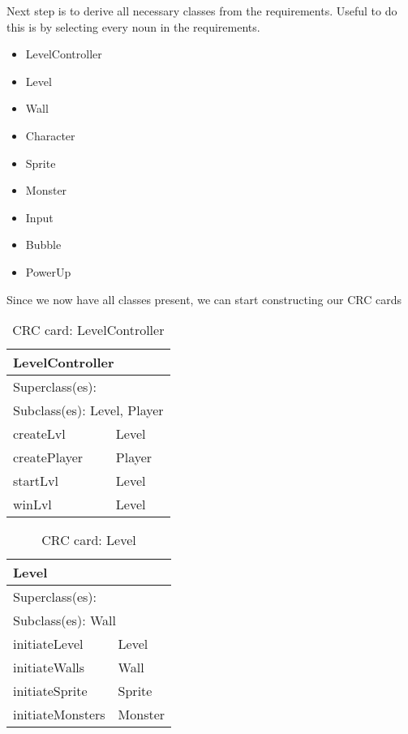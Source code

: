 \noindent Next step is to derive all necessary classes from the requirements. Useful to do this is by selecting every noun in the requirements. 
\begin{itemize}
    \item LevelController
    \item Level
    \item Wall
    \item Character
    \item Sprite
    \item Monster
    \item Input
    \item Bubble
    \item PowerUp
\end{itemize}

\noindent Since we now have all classes present, we can start constructing our CRC cards

\begin{table}[]
\centering
\label{crc_levelcontroller}
\begin{tabular}{|l|l|}
\hline
\multicolumn{2}{|l|}{LevelController} \\ \hline
\multicolumn{2}{|l|}{Superclass(es):} \\ \hline
\multicolumn{2}{|l|}{Subclass(es): Level, Player} \\ \hline
createLvl               & Level \\ \hline
createPlayer            & Player \\ \hline
startLvl                & Level \\ \hline
winLvl                  & Level \\ \hline
\end{tabular}
\caption{CRC card: LevelController}
\end{table}

\begin{table}[]
\centering
\label{crc_level}
\begin{tabular}{|l|l|}
\hline
\multicolumn{2}{|l|}{Level} \\ \hline
\multicolumn{2}{|l|}{Superclass(es):} \\ \hline
\multicolumn{2}{|l|}{Subclass(es): Wall} \\ \hline
initiateLevel           & Level \\ \hline
initiateWalls           & Wall \\ \hline
initiateSprite          & Sprite \\ \hline
initiateMonsters        & Monster \\ \hline
\end{tabular}
\caption{CRC card: Level}
\end{table}

